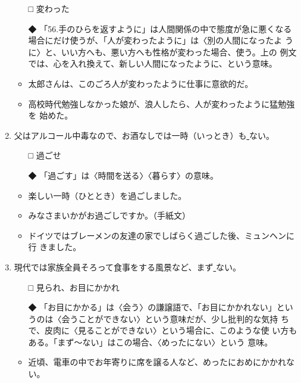 \documentclass[
uplatex,
b5paper,
10pt,
dvipdfmx
]{jsbook}
\begin{document}
\begin{enumerate}
\begin{itemize}
\item[□] 変わった
\item[◆] 「56.手のひらを返すように」は人間関係の中で態度が急に悪くなる
	  場合にだけ使うが、「人が変わったように」は〈別の人間になったよ
	  うに〉と、いい方へも、悪い方へも性格が変わった場合、使う。上の
	  例文では、心を入れ換えて、新しい人間になったように、という意味。
\end{itemize}
\begin{itemize}
\item 太郎さんは、このごろ人が変わったように仕事に意欲的だ。
\item 高校時代勉強しなかった娘が、浪人したら、人が変わったように猛勉強を
      始めた。
\end{itemize}
  

\item 父はアルコール中毒なので、お酒なしでは一時（いっとき）も\underline{   }ない。

\begin{itemize}
\item[□] 過ごせ
\item[◆] 「過ごす」は〈時間を送る〉〈暮らす〉の意味。
\end{itemize}
\begin{itemize}
\item 楽しい一時（ひととき）を過ごしました。
\item みなさまいかがお過ごしですか。（手紙文）
\item ドイツではブレーメンの友達の家でしばらく過ごした後、ミュンヘンに行
      きました。
\end{itemize}


\item 現代では家族全員そろって食事をする風景など、まず\underline{    }ない。

\begin{itemize}
\item[□] 見られ、お目にかかれ
\item[◆] 「お目にかかる」は〈会う〉の謙譲語で、「お目にかかれない」とい
	   うのは〈会うことができない〉という意味だが、少し批判的な気持
	   ちで、皮肉に〈見ることができない〉という場合に、このような使
	   い方もある。「まず〜ない」はこの場合、〈めったにない〉という
	   意味。
\end{itemize}
\begin{itemize}
\item 近頃、電車の中でお年寄りに席を譲る人など、めったにおめにかかれない。
\end{itemize}


\end{enumerate}
\end{document}
